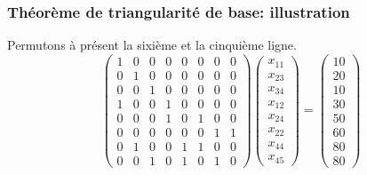 \documentclass[usepdftitle=false]{beamer}
\begin{document}
\begin{frame}
\frametitle{Théorème de triangularité de base: illustration}

Permutons à présent la sixième et la cinquième ligne.
\[
\begin{pmatrix}
 1 & 0 & 0 & 0 & 0 & 0 & 0 & 0 \\
 0 & 1 & 0 & 0 & 0 & 0 & 0 & 0 \\
 0 & 0 & 1 & 0 & 0 & 0 & 0 & 0 \\
 1 & 0 & 0 & 1 & 0 & 0 & 0 & 0 \\
 0 & 0 & 0 & 1 & 0 & 1 & 0 & 0 \\
 0 & 0 & 0 & 0 & 0 & 0 & 1 & 1 \\
 0 & 1 & 0 & 0 & 1 & 1 & 0 & 0 \\
 0 & 0 & 1 & 0 & 1 & 0 & 1 & 0
\end{pmatrix}
\begin{pmatrix}
x_{11} \\
x_{23} \\
x_{34} \\
x_{12} \\
x_{24} \\
x_{22} \\
x_{44} \\
x_{45}
\end{pmatrix}
=
\begin{pmatrix}
10 \\
20 \\
10 \\
30 \\
50 \\
60 \\
80 \\
80
\end{pmatrix}
\]

\end{frame}
\end{document}
